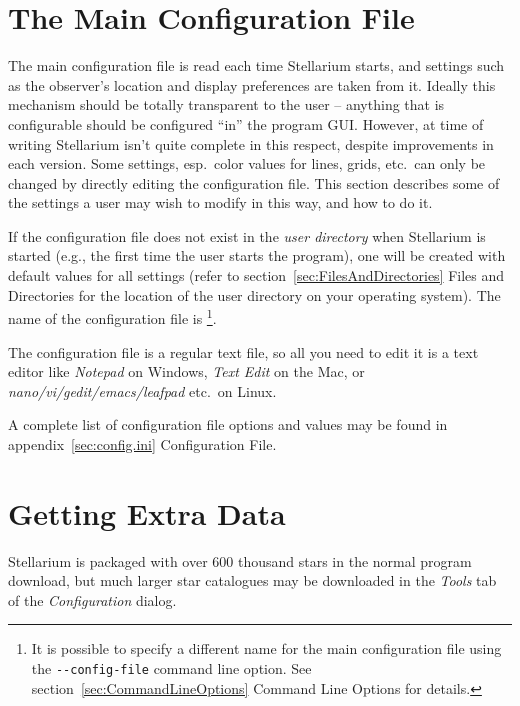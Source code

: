 \section{The Main Configuration File}
\label{sec:ConfigurationFile}

The main configuration file is read each time Stellarium starts, and
settings such as the observer's location and display preferences are
taken from it. Ideally this mechanism should be totally transparent to
the user -- anything that is configurable should be configured ``in'' the
program GUI. However, at time of writing Stellarium isn't quite complete
in this respect, despite improvements in each version. Some settings, 
esp.\ color values for lines, grids, etc.\ 
can only be changed by directly editing the configuration file. This
section describes some of the settings a user may wish to modify in this
way, and how to do it.

If the configuration file does not exist in the \emph{user directory}
when Stellarium is started (e.g., the first time the user starts the
program), one will be created with default values for all settings
(refer to section~\ref{sec:FilesAndDirectories} Files and
Directories for the location of the user directory on your operating
system). The name of the configuration file is
\footnote{It is possible to specify a different name
  for the main configuration file using the \texttt{-\/-config-file}
  command line option. See section~\ref{sec:CommandLineOptions} Command 
  Line Options for details.}.

The configuration file is a regular text file, so all you need to edit
it is a text editor like \emph{Notepad} on Windows, \emph{Text Edit} on
the Mac, or \emph{nano/vi/gedit/emacs/leafpad} etc.\ on Linux.

A complete list of configuration file options and values may be found
in appendix~\ref{sec:config.ini} Configuration File.



\section{Getting Extra Data}
\label{sec:ExtraData}

Stellarium is packaged with over 600 thousand stars in the normal
program download, but much larger star catalogues may be downloaded
in the \emph{Tools} tab of the \emph{Configuration} dialog.


